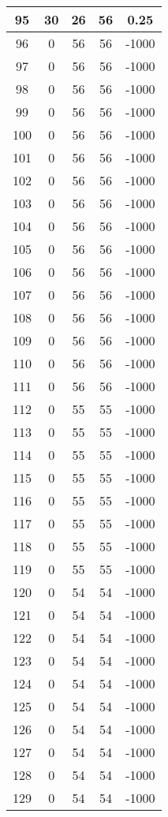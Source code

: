 \documentclass[letterpaper, 12pt]{article}
\begin{document}
\begin{longtable}{|c|c|c|c|c|}
\hline
95 & 30 & 26 & 56 & 0.25 \\
\hline
96 & 0 & 56 & 56 & -1000 \\
\hline
97 & 0 & 56 & 56 & -1000 \\
\hline
98 & 0 & 56 & 56 & -1000 \\
\hline
99 & 0 & 56 & 56 & -1000 \\
\hline
100 & 0 & 56 & 56 & -1000 \\
\hline
101 & 0 & 56 & 56 & -1000 \\
\hline
102 & 0 & 56 & 56 & -1000 \\
\hline
103 & 0 & 56 & 56 & -1000 \\
\hline
104 & 0 & 56 & 56 & -1000 \\
\hline
105 & 0 & 56 & 56 & -1000 \\
\hline
106 & 0 & 56 & 56 & -1000 \\
\hline
107 & 0 & 56 & 56 & -1000 \\
\hline
108 & 0 & 56 & 56 & -1000 \\
\hline
109 & 0 & 56 & 56 & -1000 \\
\hline
110 & 0 & 56 & 56 & -1000 \\
\hline
111 & 0 & 56 & 56 & -1000 \\
\hline
112 & 0 & 55 & 55 & -1000 \\
\hline
113 & 0 & 55 & 55 & -1000 \\
\hline
114 & 0 & 55 & 55 & -1000 \\
\hline
115 & 0 & 55 & 55 & -1000 \\
\hline
116 & 0 & 55 & 55 & -1000 \\
\hline
117 & 0 & 55 & 55 & -1000 \\
\hline
118 & 0 & 55 & 55 & -1000 \\
\hline
119 & 0 & 55 & 55 & -1000 \\
\hline
120 & 0 & 54 & 54 & -1000 \\
\hline
121 & 0 & 54 & 54 & -1000 \\
\hline
122 & 0 & 54 & 54 & -1000 \\
\hline
123 & 0 & 54 & 54 & -1000 \\
\hline
124 & 0 & 54 & 54 & -1000 \\
\hline
125 & 0 & 54 & 54 & -1000 \\
\hline
126 & 0 & 54 & 54 & -1000 \\
\hline
127 & 0 & 54 & 54 & -1000 \\
\hline
128 & 0 & 54 & 54 & -1000 \\
\hline
129 & 0 & 54 & 54 & -1000 \\

\end{longtable}
\end{document}

